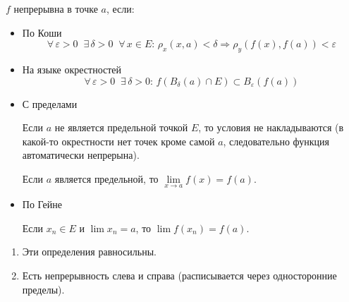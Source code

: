 $f$ непрерывна в точке $a$, если:
\begin{itemize}
    \item По Коши
    \[ \forall \, \varepsilon > 0 \;\; \exists \, \delta > 0 \;\; \forall \, x \in E : \, \rho_x(x, a) < \delta \Rightarrow \rho_y(f(x), f(a)) < \varepsilon \]
    \item На языке окрестностей
    \[ \forall \, \varepsilon > 0 \;\; \exists \, \delta > 0 : \, f(B_{\delta}(a) \cap E) \subset B_{\varepsilon}(f(a)) \]
    \item С пределами
    
    Если $a$ не является предельной точкой $E$, то условия не накладываются (в какой-то окрестности нет точек кроме самой $a$, следовательно функция автоматически непрерына).

    Если $a$ является предельной, то $\lim\limits_{x \to a} f(x) = f(a)$.
    \item По Гейне
    
    Если $x_n \in E$ и $\lim x_n = a$, то $\lim f(x_n) = f(a)$.
\end{itemize}
\begin{notice}
    \begin{enumerate}
        \item Эти определения равносильны.
        \item Есть непрерывность слева и справа (расписывается через односторонние пределы).
    \end{enumerate}
\end{notice}